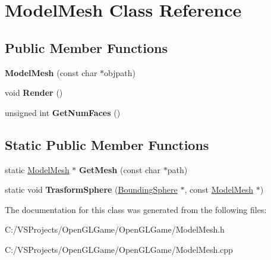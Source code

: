 \hypertarget{class_model_mesh}{\section{Model\-Mesh Class Reference}
\label{class_model_mesh}
}
\subsection*{Public Member Functions}
\begin{DoxyCompactItemize}
\item 
\hypertarget{class_model_mesh_aa6fc32846b39d92b72062ae23c05f3ea}{{\bfseries Model\-Mesh} (const char $\ast$objpath)}\label{class_model_mesh_aa6fc32846b39d92b72062ae23c05f3ea}

\item 
\hypertarget{class_model_mesh_ae0c05263b2bb7d9ffaad0df091938383}{void {\bfseries Render} ()}\label{class_model_mesh_ae0c05263b2bb7d9ffaad0df091938383}

\item 
\hypertarget{class_model_mesh_aa398f095f6decfc1be8fe8da95074b98}{unsigned int {\bfseries Get\-Num\-Faces} ()}\label{class_model_mesh_aa398f095f6decfc1be8fe8da95074b98}

\end{DoxyCompactItemize}
\subsection*{Static Public Member Functions}
\begin{DoxyCompactItemize}
\item 
\hypertarget{class_model_mesh_aad22385bfd733559e9ecd3aef8fefdae}{static \hyperlink{class_model_mesh}{Model\-Mesh} $\ast$ {\bfseries Get\-Mesh} (const char $\ast$path)}\label{class_model_mesh_aad22385bfd733559e9ecd3aef8fefdae}

\item 
\hypertarget{class_model_mesh_a31fcec93c28dbb8c1850b5c85dd1ee3d}{static void {\bfseries Trasform\-Sphere} (\hyperlink{struct_bounding_sphere}{Bounding\-Sphere} $\ast$, const \hyperlink{class_model_mesh}{Model\-Mesh} $\ast$)}\label{class_model_mesh_a31fcec93c28dbb8c1850b5c85dd1ee3d}

\end{DoxyCompactItemize}


The documentation for this class was generated from the following files\-:\begin{DoxyCompactItemize}
\item 
C\-:/\-V\-S\-Projects/\-Open\-G\-L\-Game/\-Open\-G\-L\-Game/Model\-Mesh.\-h\item 
C\-:/\-V\-S\-Projects/\-Open\-G\-L\-Game/\-Open\-G\-L\-Game/Model\-Mesh.\-cpp\end{DoxyCompactItemize}
